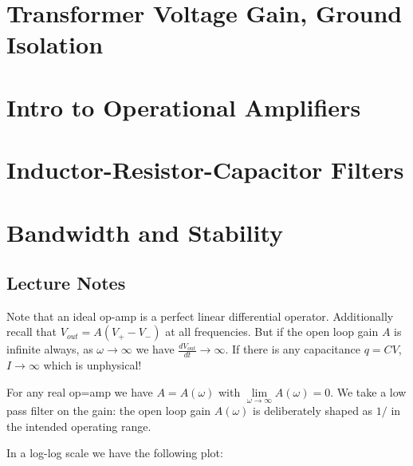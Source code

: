 \documentclass[12pt, a4paper, oneside, openright, titlepage]{book}
\begin{document}
\chapter{Transformer Voltage Gain, Ground Isolation}

\chapter{Intro to Operational Amplifiers}

\chapter{Inductor-Resistor-Capacitor Filters}


\chapter{Bandwidth and Stability}

\section{Lecture Notes}

Note that an ideal op-amp is a perfect linear differential operator. Additionally recall that $V_{out} = A(V_+-V_-)$ at all frequencies. But if the open loop gain $A$ is infinite always, as $\omega\rightarrow \infty$ we have $\frac{dV_{out}}{dt}\rightarrow \infty$. If there is any capacitance $q = CV$, $I\rightarrow \infty$ which is unphysical!

For any real op=amp we have $A = A(\omega)$ with $\lim\limits_{\omega\rightarrow \infty}A(\omega) = 0$. We take a low pass filter on the gain: the open loop gain $A(\omega)$ is deliberately shaped as $1/$ in the intended operating range.

In a log-log scale we have the following plot:
\end{document}
